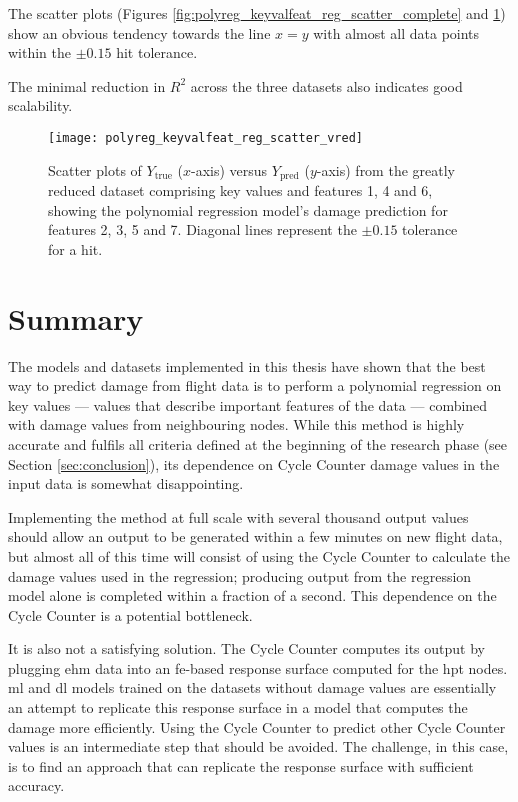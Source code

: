 The scatter plots (Figures \ref{fig:polyreg_keyvalfeat_reg_scatter_complete} and \ref{fig:polyreg_keyvalfeat_reg_scatter_vred}) show an obvious tendency towards the line \(x = y\) with almost all data points within the \(\pm0.15\) hit tolerance.

The minimal reduction in \(R^2\) across the three datasets also indicates good scalability.

\begin{figure}
    \centering
    \texttt{[image: polyreg\_keyvalfeat\_reg\_scatter\_vred]}
    \caption{\label{fig:polyreg_keyvalfeat_reg_scatter_vred} Scatter plots of \(Y_\text{true}\) (\(x\)-axis) versus \(Y_\text{pred}\) (\(y\)-axis) from the greatly reduced dataset comprising key values and features 1, 4 and 6, showing the polynomial regression model's damage prediction for features 2, 3, 5 and 7. Diagonal lines represent the \(\pm0.15\) tolerance for a hit.}
\end{figure}

\section{Summary}
The models and datasets implemented in this thesis have shown that the best way to predict damage from flight data is to perform a polynomial regression on key values --- values that describe important features of the data --- combined with damage values from neighbouring nodes. While this method is highly accurate and fulfils all criteria defined at the beginning of the research phase (see Section \ref{sec:conclusion}), its dependence on Cycle Counter damage values in the input data is somewhat disappointing.

Implementing the method at full scale with several thousand output values should allow an output to be generated within a few minutes on new flight data, but almost all of this time will consist of using the Cycle Counter to calculate the damage values used in the regression; producing output from the regression model alone is completed within a fraction of a second. This dependence on the Cycle Counter is a potential bottleneck.

It is also not a satisfying solution. The Cycle Counter computes its output by plugging \ac{ehm} data into an \ac{fe}-based response surface computed for the \ac{hpt} nodes. \ac{ml} and \ac{dl} models trained on the datasets without damage values are essentially an attempt to replicate this response surface in a model that computes the damage more efficiently. Using the Cycle Counter to predict other Cycle Counter values is an intermediate step that should be avoided. The challenge, in this case, is to find an approach that can replicate the response surface with sufficient accuracy.

